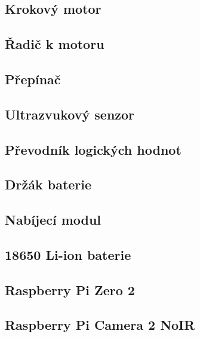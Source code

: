 \documentclass[12pt]{article}
\begin{document}
\begin{spacing}{1.5}
	\subsection{Krokový motor}
	\subsection{Řadič k motoru}
	\subsection{Přepínač}
	\subsection{Ultrazvukový senzor}
	\subsection{Převodník logických hodnot}
	\subsection{Držák baterie}
	\subsection{Nabíjecí modul}
	\subsection{18650 Li-ion baterie}
	\subsection{Raspberry Pi Zero 2}
	\subsection{Raspberry Pi Camera 2 NoIR}
	
\end{spacing}
\end{document}
